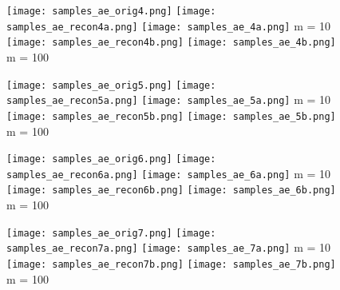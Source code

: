 \documentclass{article}
\begin{document}
\begin{figure*}[t]

\begin{subfigure}{0.98\textwidth}
  \centering
  \texttt{[image: samples\_ae\_orig4.png]}
  \hfill
  \texttt{[image: samples\_ae\_recon4a.png]}
  \hfill
  \texttt{[image: samples\_ae\_4a.png]}
  m = 10\hphantom{0}
  \\
  \hspace{26pt}
  \hfill
  \texttt{[image: samples\_ae\_recon4b.png]}
  \hfill
  \texttt{[image: samples\_ae\_4b.png]}
  m = 100
\end{subfigure}

\vspace{6pt}

\begin{subfigure}{0.98\textwidth}
  \centering
  \texttt{[image: samples\_ae\_orig5.png]}
  \hfill
  \texttt{[image: samples\_ae\_recon5a.png]}
  \hfill
  \texttt{[image: samples\_ae\_5a.png]}
  m = 10\hphantom{0}
  \\
  \hspace{26pt}
  \hfill
  \texttt{[image: samples\_ae\_recon5b.png]}
  \hfill
  \texttt{[image: samples\_ae\_5b.png]}
  m = 100
\end{subfigure}

\vspace{6pt}

\begin{subfigure}{0.98\textwidth}
  \centering
  \texttt{[image: samples\_ae\_orig6.png]}
  \hfill
  \texttt{[image: samples\_ae\_recon6a.png]}
  \hfill
  \texttt{[image: samples\_ae\_6a.png]}
  m = 10\hphantom{0}
  \\
  \hspace{26pt}
  \hfill
  \texttt{[image: samples\_ae\_recon6b.png]}
  \hfill
  \texttt{[image: samples\_ae\_6b.png]}
  m = 100
\end{subfigure}

\vspace{6pt}

\begin{subfigure}{0.98\textwidth}
  \centering
  \texttt{[image: samples\_ae\_orig7.png]}
  \hfill
  \texttt{[image: samples\_ae\_recon7a.png]}
  \hfill
  \texttt{[image: samples\_ae\_7a.png]}
  m = 10\hphantom{0}
  \\
  \hspace{26pt}
  \hfill
  \texttt{[image: samples\_ae\_recon7b.png]}
  \hfill
  \texttt{[image: samples\_ae\_7b.png]}
  m = 100
\end{subfigure}


\end{figure*}
\end{document}
